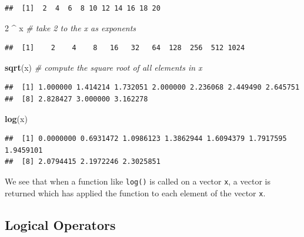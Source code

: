\documentclass[]{book}
\newenvironment{Shaded}{\begin{snugshade}}{\end{snugshade}}
\newcommand{\KeywordTok}[1]{\textcolor[rgb]{0.13,0.29,0.53}{\textbf{#1}}}
\newcommand{\DecValTok}[1]{\textcolor[rgb]{0.00,0.00,0.81}{#1}}
\newcommand{\StringTok}[1]{\textcolor[rgb]{0.31,0.60,0.02}{#1}}
\newcommand{\CommentTok}[1]{\textcolor[rgb]{0.56,0.35,0.01}{\textit{#1}}}
\newcommand{\OperatorTok}[1]{\textcolor[rgb]{0.81,0.36,0.00}{\textbf{#1}}}
\newcommand{\NormalTok}[1]{#1}
\theoremstyle{definition}
\theoremstyle{definition}
\theoremstyle{definition}
\theoremstyle{remark}
\begin{document}
\begin{verbatim}
##  [1]  2  4  6  8 10 12 14 16 18 20
\end{verbatim}

\begin{Shaded}
\begin{Highlighting}[]
\DecValTok{2} \OperatorTok{^}\StringTok{ }\NormalTok{x     }\CommentTok{# take 2 to the x as exponents}
\end{Highlighting}
\end{Shaded}

\begin{verbatim}
##  [1]    2    4    8   16   32   64  128  256  512 1024
\end{verbatim}

\begin{Shaded}
\begin{Highlighting}[]
\KeywordTok{sqrt}\NormalTok{(x)   }\CommentTok{# compute the square root of all elements in x}
\end{Highlighting}
\end{Shaded}

\begin{verbatim}
##  [1] 1.000000 1.414214 1.732051 2.000000 2.236068 2.449490 2.645751
##  [8] 2.828427 3.000000 3.162278
\end{verbatim}

\begin{Shaded}
\begin{Highlighting}[]
\KeywordTok{log}\NormalTok{(x)}
\end{Highlighting}
\end{Shaded}

\begin{verbatim}
##  [1] 0.0000000 0.6931472 1.0986123 1.3862944 1.6094379 1.7917595 1.9459101
##  [8] 2.0794415 2.1972246 2.3025851
\end{verbatim}

We see that when a function like \texttt{log()} is called on a vector
\texttt{x}, a vector is returned which has applied the function to each
element of the vector \texttt{x}.

\subsection{Logical Operators}\label{logical-operators}
\end{document}

